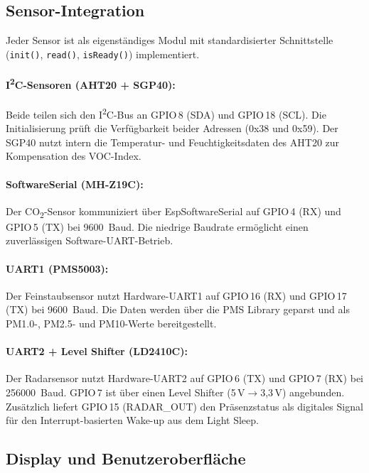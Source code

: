 \subsection{Sensor-Integration}

Jeder Sensor ist als eigenständiges Modul mit standardisierter Schnittstelle (\texttt{init()}, \texttt{read()}, \texttt{isReady()}) implementiert.

\paragraph{I\textsuperscript{2}C-Sensoren (AHT20 + SGP40):}
Beide teilen sich den I\textsuperscript{2}C-Bus an GPIO\,8 (SDA) und GPIO\,18 (SCL). Die Initialisierung prüft die Verfügbarkeit beider Adressen (0x38 und 0x59). Der SGP40 nutzt intern die Temperatur- und Feuchtigkeitsdaten des AHT20 zur Kompensation des VOC-Index.

\paragraph{SoftwareSerial (MH-Z19C):}
Der CO\textsubscript{2}-Sensor kommuniziert über EspSoftwareSerial auf GPIO\,4 (RX) und GPIO\,5 (TX) bei \SI{9600}{Baud}. Die niedrige Baudrate ermöglicht einen zuverlässigen Software-UART-Betrieb.

\paragraph{UART1 (PMS5003):}
Der Feinstaubsensor nutzt Hardware-UART1 auf GPIO\,16 (RX) und GPIO\,17 (TX) bei \SI{9600}{Baud}. Die Daten werden über die PMS Library geparst und als PM1.0-, PM2.5- und PM10-Werte bereitgestellt.

\paragraph{UART2 + Level Shifter (LD2410C):}
Der Radarsensor nutzt Hardware-UART2 auf GPIO\,6 (TX) und GPIO\,7 (RX) bei \SI{256000}{Baud}. GPIO\,7 ist über einen Level Shifter (5\,V$\rightarrow$3,3\,V) angebunden. Zusätzlich liefert GPIO\,15 (RADAR\_OUT) den Präsenzstatus als digitales Signal für den Interrupt-basierten Wake-up aus dem Light Sleep.

\subsection{Display und Benutzeroberfläche}

